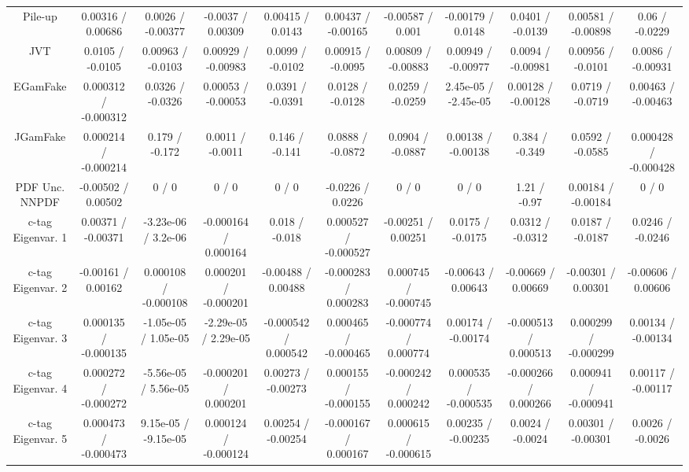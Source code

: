 \begin{table}[htbp]
\begin{center}
\begin{tabular}{|c|c|c|c|c|c|c|c|c|c|c|}
  Pile-up & 0.00316 / 0.00686 & 0.0026 / -0.00377 & -0.0037 / 0.00309 & 0.00415 / 0.0143 & 0.00437 / -0.00165 & -0.00587 / 0.001 & -0.00179 / 0.0148 & 0.0401 / -0.0139 & 0.00581 / -0.00898 & 0.06 / -0.0229 \\ 
  JVT & 0.0105 / -0.0105 & 0.00963 / -0.0103 & 0.00929 / -0.00983 & 0.0099 / -0.0102 & 0.00915 / -0.0095 & 0.00809 / -0.00883 & 0.00949 / -0.00977 & 0.0094 / -0.00981 & 0.00956 / -0.0101 & 0.0086 / -0.00931 \\ 
  EGamFake & 0.000312 / -0.000312 & 0.0326 / -0.0326 & 0.00053 / -0.00053 & 0.0391 / -0.0391 & 0.0128 / -0.0128 & 0.0259 / -0.0259 & 2.45e-05 / -2.45e-05 & 0.00128 / -0.00128 & 0.0719 / -0.0719 & 0.00463 / -0.00463 \\ 
  JGamFake & 0.000214 / -0.000214 & 0.179 / -0.172 & 0.0011 / -0.0011 & 0.146 / -0.141 & 0.0888 / -0.0872 & 0.0904 / -0.0887 & 0.00138 / -0.00138 & 0.384 / -0.349 & 0.0592 / -0.0585 & 0.000428 / -0.000428 \\ 
  PDF Unc. NNPDF & -0.00502 / 0.00502 & 0 / 0 & 0 / 0 & 0 / 0 & -0.0226 / 0.0226 & 0 / 0 & 0 / 0 & 1.21 / -0.97 & 0.00184 / -0.00184 & 0 / 0 \\ 
  c-tag Eigenvar. 1 & 0.00371 / -0.00371 & -3.23e-06 / 3.2e-06 & -0.000164 / 0.000164 & 0.018 / -0.018 & 0.000527 / -0.000527 & -0.00251 / 0.00251 & 0.0175 / -0.0175 & 0.0312 / -0.0312 & 0.0187 / -0.0187 & 0.0246 / -0.0246 \\ 
  c-tag Eigenvar. 2 & -0.00161 / 0.00162 & 0.000108 / -0.000108 & 0.000201 / -0.000201 & -0.00488 / 0.00488 & -0.000283 / 0.000283 & 0.000745 / -0.000745 & -0.00643 / 0.00643 & -0.00669 / 0.00669 & -0.00301 / 0.00301 & -0.00606 / 0.00606 \\ 
  c-tag Eigenvar. 3 & 0.000135 / -0.000135 & -1.05e-05 / 1.05e-05 & -2.29e-05 / 2.29e-05 & -0.000542 / 0.000542 & 0.000465 / -0.000465 & -0.000774 / 0.000774 & 0.00174 / -0.00174 & -0.000513 / 0.000513 & 0.000299 / -0.000299 & 0.00134 / -0.00134 \\ 
  c-tag Eigenvar. 4 & 0.000272 / -0.000272 & -5.56e-05 / 5.56e-05 & -0.000201 / 0.000201 & 0.00273 / -0.00273 & 0.000155 / -0.000155 & -0.000242 / 0.000242 & 0.000535 / -0.000535 & -0.000266 / 0.000266 & 0.000941 / -0.000941 & 0.00117 / -0.00117 \\ 
  c-tag Eigenvar. 5 & 0.000473 / -0.000473 & 9.15e-05 / -9.15e-05 & 0.000124 / -0.000124 & 0.00254 / -0.00254 & -0.000167 / 0.000167 & 0.000615 / -0.000615 & 0.00235 / -0.00235 & 0.0024 / -0.0024 & 0.00301 / -0.00301 & 0.0026 / -0.0026 \\ 

\end{tabular}
\end{center}
\end{table}
